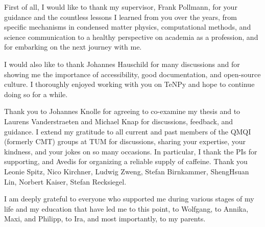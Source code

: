 First of all, I would like to thank my supervisor, Frank Pollmann, for your guidance and the countless lessons I learned from you over the years, from specific mechanisms in condensed matter physics, computational methods, and science communication to a healthy perspective on academia as a profession, and for embarking on the next journey with me.


I would also like to thank Johannes Hauschild for many discussions and for showing me the importance of accessibility, good documentation, and open-source culture.
%
I thoroughly enjoyed working with you on TeNPy and hope to continue doing so for a while.

Thank you to Johannes Knolle for agreeing to co-examine my thesis and to Laurens Vanderstraeten and Michael Knap for discussions, feedback, and guidance.
%
I extend my gratitude to all current and past members of the QMQI (formerly CMT) groups at TUM for discussions, sharing your expertise, your kindness, and your jokes on so many occasions.
%
In particular, I thank the PIs for supporting, and Avedis for organizing a reliable supply of caffeine.
%
Thank you Leonie Spitz, Nico Kirchner, Ludwig Zweng, Stefan Birnkammer, ShengHsuan Lin, Norbert Kaiser, Stefan Recksiegel.

I am deeply grateful to everyone who supported me during various stages of my life and my education that have led me to this point, to Wolfgang, to Annika, Maxi, and Philipp, to Ira, and most importantly, to my parents.
